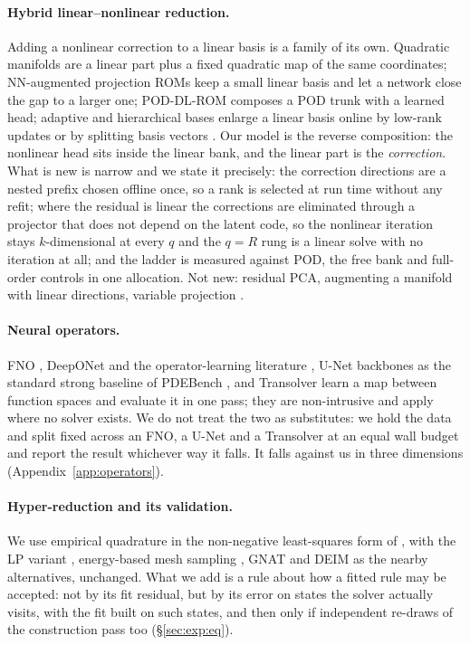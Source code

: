 \paragraph{Hybrid linear--nonlinear reduction.}
Adding a nonlinear correction to a linear basis is a family of its own.
Quadratic manifolds \citep{GeelenWrightWillcox2022,BarnettFarhat2022} are a
linear part plus a fixed quadratic map of the same coordinates;
NN-augmented projection ROMs \citep{BarnettFarhatMaday2023} keep a small linear
basis and let a network close the gap to a larger one; POD-DL-ROM
\citep{FrescaManzoni2022PODDLROM} composes a POD trunk with a learned head;
adaptive and hierarchical bases enlarge a linear basis online by low-rank
updates \citep{PeherstorferWillcox2015Adaptive} or by splitting basis vectors
\citep{Carlberg2015hRefinement}. Our model is the reverse composition: the
nonlinear head sits inside the linear bank, and the linear part is the
\emph{correction}. What is new is narrow and we state it precisely: the
correction directions are a nested prefix chosen offline once, so a rank is
selected at run time without any refit; where the residual is linear the
corrections are eliminated through a projector that does not depend on the
latent code, so the nonlinear iteration stays $k$-dimensional at every $q$ and
the $q=R$ rung is a linear solve with no iteration at all; and the ladder is
measured against POD, the free bank and full-order controls in one allocation.
Not new: residual PCA, augmenting a manifold with linear directions, variable
projection \citep{GolubPereyra1973}.

\paragraph{Neural operators.}
FNO \citep{Li2020FNO}, DeepONet \citep{Lu2021DeepONet} and the operator-learning
literature \citep{Kovachki2023NeuralOperator}, U-Net backbones
\citep{Ronneberger2015UNet} as the standard strong baseline of PDEBench
\citep{Takamoto2022PDEBench}, and Transolver \citep{Wu2024Transolver} learn a
map between function spaces and evaluate it in one pass; they are non-intrusive
and apply where no solver exists. We do not treat the two as substitutes: we
hold the data and split fixed across an FNO, a U-Net and a Transolver at an
equal wall budget and report the result whichever way it falls. It falls
against us in three dimensions (Appendix~\ref{app:operators}).

\paragraph{Hyper-reduction and its validation.}
We use empirical quadrature in the non-negative least-squares form of
\citet{Hernandez2017EQ}, with the LP variant \citep{YanoPatera2019LPEQ},
energy-based mesh sampling \citep{FarhatECSW2014,Chapman2017AcceleratedECSW},
GNAT \citep{Carlberg2013GNAT} and DEIM \citep{ChaturantabutSorensen2010} as
the nearby alternatives, unchanged. What we add is a rule about how a fitted
rule may be accepted: not by its fit residual, but by its error on states the
solver actually visits, with the fit built on such states, and then only if
independent re-draws of the construction pass too (\S\ref{sec:exp:eq}).

